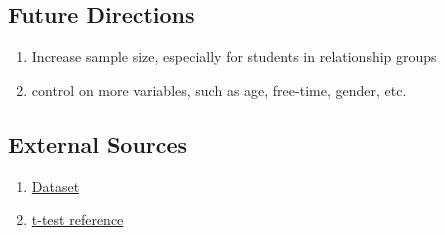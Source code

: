 \documentclass[]{article}
\providecommand{\tightlist}{%
  \setlength{\itemsep}{0pt}\setlength{\parskip}{0pt}}
\begin{document}
\subsection{Future Directions}\label{future-directions}

\begin{enumerate}
\def\labelenumi{\arabic{enumi}.}
\tightlist
\item
  Increase sample size, especially for students in relationship groups
\item
  control on more variables, such as age, free-time, gender, etc.
\end{enumerate}

\subsection{External Sources}\label{external-sources}

\begin{enumerate}
\def\labelenumi{\arabic{enumi}.}
\tightlist
\item
  \href{https://archive.ics.uci.edu/ml/datasets/Student+Performance}{Dataset}
\item
  \href{https://en.wikipedia.org/wiki/Welch\%27s_t-test}{t-test
  reference}
\end{enumerate}
\end{document}
